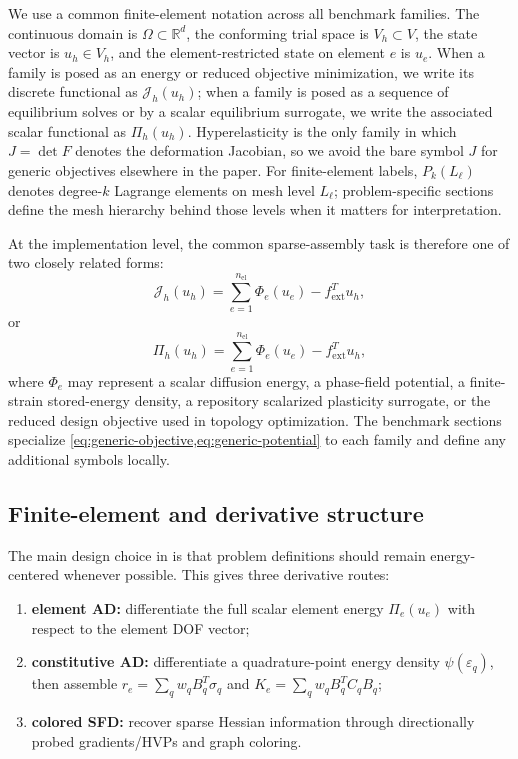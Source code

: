 \label{sec:methodology}

We use a common finite-element notation across all benchmark families. The
continuous domain is $\Omega \subset \mathbb{R}^d$, the conforming trial space
is $V_h \subset V$, the state vector is $u_h \in V_h$, and the element-restricted
state on element $e$ is $u_e$. When a family is posed as an energy or reduced
objective minimization, we write its discrete functional as
$\mathcal{J}_h(u_h)$; when a family is posed as a sequence of equilibrium
solves or by a scalar equilibrium surrogate, we write the associated scalar
functional as $\Pi_h(u_h)$.
Hyperelasticity is the only family in which $J=\det F$ denotes the deformation
Jacobian, so we avoid the bare symbol $J$ for generic objectives elsewhere in
the paper.
For finite-element labels, $P_k(L_\ell)$ denotes degree-$k$ Lagrange elements
on mesh level $L_\ell$; problem-specific sections define the mesh hierarchy
behind those levels when it matters for interpretation.

At the implementation level, the common sparse-assembly task is therefore one
of two closely related forms:
\begin{equation}
  \mathcal{J}_h(u_h)
  = \sum_{e=1}^{n_{\mathrm{el}}} \Phi_e(u_e) - f_{\mathrm{ext}}^T u_h,
  \label{eq:generic-objective}
\end{equation}
or
\begin{equation}
  \Pi_h(u_h)
  = \sum_{e=1}^{n_{\mathrm{el}}} \Phi_e(u_e) - f_{\mathrm{ext}}^T u_h,
  \label{eq:generic-potential}
\end{equation}
where $\Phi_e$ may represent a scalar diffusion energy, a phase-field
potential, a finite-strain stored-energy density, a repository scalarized
plasticity surrogate, or the reduced design objective used in topology
optimization. The benchmark
sections specialize \cref{eq:generic-objective,eq:generic-potential} to each
family and define any additional symbols locally.

\subsection{Finite-element and derivative structure}

The main design choice in \repo{} is that problem definitions should remain
energy-centered whenever possible. This gives three derivative routes:
\begin{enumerate}
  \item \textbf{element AD:} differentiate the full scalar element energy
        $\Pi_e(u_e)$ with respect to the element DOF vector;
  \item \textbf{constitutive AD:} differentiate a quadrature-point energy
        density $\psi(\varepsilon_q)$, then assemble
        $r_e = \sum_q w_q B_q^T \sigma_q$ and
        $K_e = \sum_q w_q B_q^T C_q B_q$;
  \item \textbf{colored SFD:} recover sparse Hessian information through
        directionally probed gradients/HVPs and graph coloring.
\end{enumerate}

